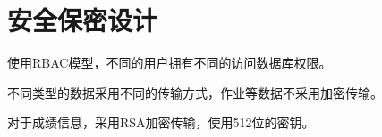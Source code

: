 \chapter{安全保密设计}
使用RBAC模型，不同的用户拥有不同的访问数据库权限。

不同类型的数据采用不同的传输方式，作业等数据不采用加密传输。

对于成绩信息，采用RSA加密传输，使用512位的密钥。

